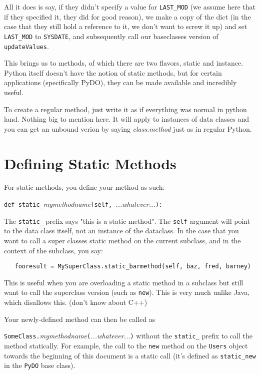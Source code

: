 \documentclass[titlepage]{manual}
\begin{document}
All it does is say, if they didn't specify a value for
\texttt{LAST_MOD} (we assume here that if they specified it, they did
for good reason), we make a copy of the dict (in the case that they
still hold a reference to it, we don't want to screw it up) and set
\texttt{LAST_MOD} to \texttt{SYSDATE}, and subsequently call our
baseclasses version of \texttt{updateValues}.

This brings us to methods, of which there are two flavors, static and
instance.  Python itself doesn't have the notion of static methods,
but for certain applications (specifically PyDO), they can be
made available and incredibly useful.

To create a regular method, just write it as if everything was normal
in python land.  Nothing big to mention here.  It will apply to
instances of data classes and you can get an unbound verion by saying
\emph{class}.\emph{method} just as in regular Python.

\section{Defining Static Methods}

For static methods, you define your method as such:

\noindent
\texttt{def static_}\emph{mymethodname}\texttt{(self, }\emph{...whatever...}\texttt{):}

The \texttt{static_} prefix says "this is a static method".  The
\texttt{self} argument will point to the data class itself, not an
instance of the dataclass.  In the case that you want to call a super
classes static method on the current subclass, and in the context of
the subclass, you say:

\begin{verbatim}
   fooresult = MySuperClass.static_barmethod(self, baz, fred, barney)
\end{verbatim}

This is useful when you are overloading a static method in a subclass
but still want to call the superclass version (such as \texttt{new}).
This is very much unlike Java, which disallows this.  (don't know
about C++)

Your newly-defined method can then be called as

\noindent
\texttt{SomeClass.}\emph{mymethodname}\texttt{(}\emph{...whatever...}\texttt{)}
without the \texttt{static_} prefix to call the method statically.
For example, the call to the \texttt{new} method on the \texttt{Users}
object towards the beginning of this document is a static call (it's
defined as \texttt{static_new} in the \texttt{PyDO} base class).
\end{document}
